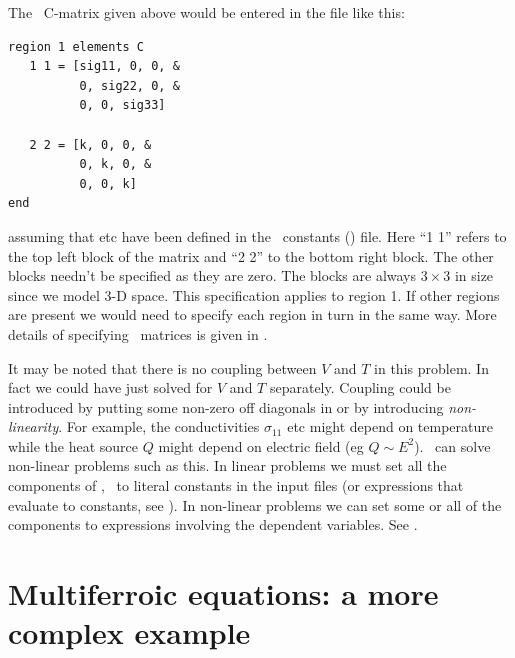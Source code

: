 \documentclass[a4paper,twoside,11pt]{book}
\begin{document}
The \zinc\ C-matrix given above would be entered in the  file like this:
\begin{verbatim}
region 1 elements C
   1 1 = [sig11, 0, 0, &
          0, sig22, 0, &
          0, 0, sig33]

   2 2 = [k, 0, 0, &
          0, k, 0, &
          0, 0, k]
end
\end{verbatim}
assuming that  etc have been defined in the
\zinc\ constants () file. Here ``1 1'' refers to the top
left block of the matrix and ``2 2'' to the bottom right block. The
other blocks needn't be specified as they are zero. The blocks are
always $3\times3$ in size since we model 3-D space. This specification
applies to region 1. If other regions are present we would need to
specify each region in turn in the same way. More details of
specifying \zinc\ matrices is given in .

It may be noted that there is no
coupling between $V$ and $T$ in this problem. In fact we could have
just solved for $V$ and $T$ separately. Coupling could be introduced
by putting some non-zero off diagonals in  or by
introducing \emph{non-linearity}. For example, the conductivities
$\sigma_{11}$ etc might depend on temperature while the heat source
$Q$ might depend on electric field (eg $Q\sim E^2$). \zinc\ can solve
non-linear problems such as this. In linear problems we must set all
the components of \caf, \qg\ to literal constants in the input files
(or expressions that evaluate to constants, see
). In non-linear problems we can set some or all of
the components to expressions involving the dependent variables. See
.

\section{Multiferroic equations: a more complex example}
\label{multiferroic}
\end{document}
